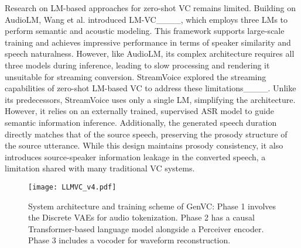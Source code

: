 Research on LM-based approaches for zero-shot VC remains limited. Building on AudioLM, Wang et al. introduced LM-VC____, which employs three LMs to perform semantic and acoustic modeling. This framework supports large-scale training and achieves impressive performance in terms of speaker similarity and speech naturalness. However, like AudioLM, its complex architecture requires all three models during inference, leading to slow processing and rendering it unsuitable for streaming conversion. StreamVoice explored the streaming capabilities of zero-shot LM-based VC to address these limitations____. Unlike its predecessors, StreamVoice uses only a single LM, simplifying the architecture. However, it relies on an externally trained, supervised ASR model to guide semantic information inference. Additionally, the generated speech duration directly matches that of the source speech, preserving the prosody structure of the source utterance. While this design maintains prosody consistency, it also introduces source-speaker information leakage in the converted speech, a limitation shared with many traditional VC systems.

\label{sec:model}
\begin{figure*}[ht]
\vskip 0.2in
  \begin{center}
  \texttt{[image: LLMVC\_v4.pdf]}
  \caption{System architecture and training scheme of GenVC:
Phase 1 involves the Discrete VAEs for audio tokenization. Phase 2 has a causal Transformer-based language model alongside a Perceiver encoder. Phase 3 includes a vocoder for waveform reconstruction.}
  \label{fig:genvc}
  \end{center}
  \vskip -0.2in
\end{figure*}